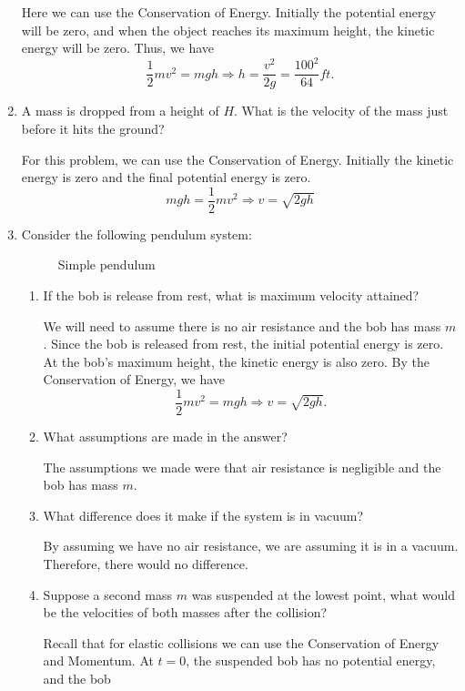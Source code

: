 \begin{enumerate}
\begin{figure}[H]
  \end{figure}
  Here we can use the Conservation of Energy.
  Initially the potential energy will be zero, and when the object reaches its
  maximum height, the kinetic energy will be zero.
  Thus, we have
  \[
  \frac{1}{2}mv^2 = mgh\Rightarrow h = \frac{v^2}{2g} = \frac{100^2}{64}ft.
  \]
\item
  A mass is dropped from a height of \(H\).
  What is the velocity of the mass just before it hits the ground?
  \par\smallskip
  For this problem, we can use the Conservation of Energy.
  Initially the kinetic energy is zero and the final potential energy is zero.
  \[
  mgh = \frac{1}{2}mv^2\Rightarrow v = \sqrt{2gh}
  \]
\item
  Consider the following pendulum system:
  \begin{figure}[H]
    \centering
    
    \caption{Simple pendulum}
  \end{figure}
  \begin{enumerate}[label = (\alph*), ref = \theenumi{(\alph*)}]
  \item
    \label{24a}
    If the bob is release from rest, what is maximum velocity attained?
    \par\smallskip
    We will need to assume there is no air resistance and the bob has mass
    \(m\).
    Since the bob is released from rest, the initial potential energy is zero.
    At the bob's maximum height, the kinetic energy is also zero.
    By the Conservation of Energy, we have
    \[
    \frac{1}{2}mv^2 = mgh\Rightarrow v = \sqrt{2gh}.
    \]
  \item
    What assumptions are made in the answer?
    \par\smallskip
    The assumptions we made were that air resistance is negligible and the bob
    has mass \(m\).
  \item
    What difference does it make if the system is in vacuum?
    \par\smallskip
    By assuming we have no air resistance, we are assuming it is in a vacuum.
    Therefore, there would no difference.
  \item
    Suppose a second mass \(m\) was suspended at the lowest point, what would
    be the velocities of both masses after the collision?
    \par\smallskip
    Recall that for elastic collisions we can use the Conservation of Energy
    and Momentum.
    At \(t = 0\), the suspended bob has no potential energy, and the bob

\end{enumerate}
\end{enumerate}
